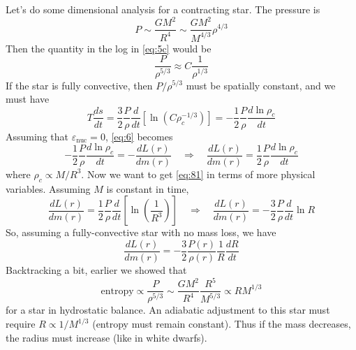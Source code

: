 \documentclass[10pt]{article}
\numberwithin{equation}{section}
\newcommand{\n}{\noindent}
\begin{document}
  \n Let's do some dimensional analysis for a contracting star. The
  pressure is
  \begin{equation}
    \label{eq:7}
    P\sim\frac{GM^2}{R^4}\sim\frac{GM^2}{M^{4/3}}\rho^{4/3}
  \end{equation}
  Then the quantity in the log in \eqref{eq:5c} would be
  \begin{equation}
    \label{eq:8}
    \frac{P}{\rho^{5/3}}\approx C\frac{1}{\rho^{1/3}}
  \end{equation}
  If the star is fully convective, then $P/\rho^{5/3}$ must be
  spatially constant, and we must have
  \begin{equation}
    \label{eq:80}
    T\frac{ds}{dt}=\frac{3}{2}\frac{P}{\rho}\frac{d}{dt}\left[\ln\left(C\rho_c^{-1/3}\right)\right]=-\frac{1}{2}\frac{P}{\rho}\frac{d\ln\rho_c}{dt}
  \end{equation}
  Assuming that $\varepsilon_{\mathrm{nuc}}=0$, \eqref{eq:6} becomes
  \begin{equation}
    \label{eq:81}
    -\frac{1}{2}\frac{P}{\rho}\frac{d\ln\rho_c}{dt}=-\frac{dL(r)}{dm(r)}\quad\Rightarrow\quad \frac{dL(r)}{dm(r)}=\frac{1}{2}\frac{P}{\rho}\frac{d\ln\rho_c}{dt}
  \end{equation}
  where $\rho_c\propto M/R^3$. Now we want to get \eqref{eq:81} in
  terms of more physical variables. Assuming $M$ is constant in time,
  \begin{equation}
    \label{eq:82}
    \frac{dL(r)}{dm(r)}=\frac{1}{2}\frac{P}{\rho}\frac{d}{dt}\left[\ln\left(\frac{1}{R^3}\right)\right]\quad\Rightarrow\quad
    \frac{dL(r)}{dm(r)}=-\frac{3}{2}\frac{P}{\rho}\frac{d}{dt}\ln R
  \end{equation}
  So, assuming a fully-convective star with no mass loss, we have
  \begin{equation}
    \label{eq:83}
    \boxed{\frac{dL(r)}{dm(r)}=-\frac{3}{2}\frac{P(r)}{\rho(r)}\frac{1}{R}\frac{dR}{dt}}
  \end{equation}
  Backtracking a bit, earlier we showed that
  \begin{equation}
    \label{eq:84}
    \mathrm{entropy}\propto \frac{P}{\rho^{5/3}}\sim\frac{GM^2}{R^4}\frac{R^5}{M^{5/3}}\propto RM^{1/3}
  \end{equation}
  for a star in hydrostatic balance. An adiabatic adjustment to this
  star must require $R\propto 1/M^{1/3}$ (entropy must remain
  constant). Thus if the mass decreases, the radius must increase
  (like in white dwarfs).\\
\end{document}
